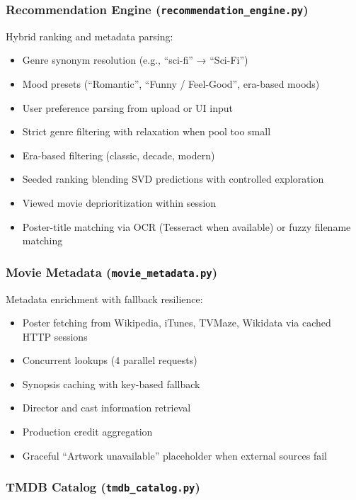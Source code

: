 \documentclass[11pt,a4paper]{article}
\begin{document}
\subsubsection{Recommendation Engine (\texttt{recommendation\_engine.py})}

Hybrid ranking and metadata parsing:

\begin{itemize}
    \item Genre synonym resolution (e.g., ``sci-fi'' → ``Sci-Fi'')
    \item Mood presets (``Romantic'', ``Funny / Feel-Good'', era-based moods)
    \item User preference parsing from upload or UI input
    \item Strict genre filtering with relaxation when pool too small
    \item Era-based filtering (classic, decade, modern)
    \item Seeded ranking blending SVD predictions with controlled exploration
    \item Viewed movie deprioritization within session
    \item Poster-title matching via OCR (Tesseract when available) or fuzzy filename matching
\end{itemize}

\subsubsection{Movie Metadata (\texttt{movie\_metadata.py})}

Metadata enrichment with fallback resilience:

\begin{itemize}
    \item Poster fetching from Wikipedia, iTunes, TVMaze, Wikidata via cached HTTP sessions
    \item Concurrent lookups (4 parallel requests)
    \item Synopsis caching with key-based fallback
    \item Director and cast information retrieval
    \item Production credit aggregation
    \item Graceful ``Artwork unavailable'' placeholder when external sources fail
\end{itemize}

\subsubsection{TMDB Catalog (\texttt{tmdb\_catalog.py})}
\end{document}
